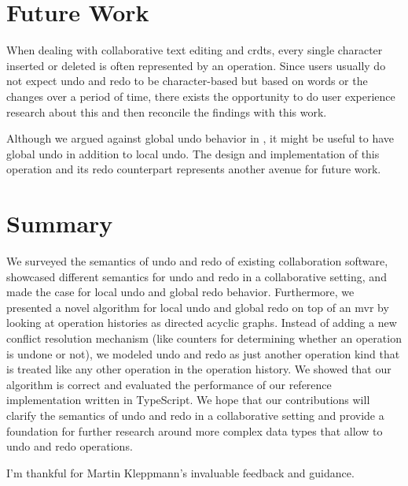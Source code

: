 \documentclass[sigplan,natbib=false,review]{acmart}
\begin{document}
\section{Future Work}\label{sec:future-work}

When dealing with collaborative text editing and \glspl*{crdt},
every single character inserted or deleted is often represented by an operation.
Since users usually do not expect undo and redo to be character-based but
based on words or the changes over a period of time, there exists the opportunity
to do user experience research about this and then reconcile the findings
with this work.

Although we argued against global undo behavior in ,
it might be useful to have global undo in addition to local undo.
The design and implementation of this operation and its redo counterpart
represents another avenue for future work.

\section{Summary}\label{sec:summary}

We surveyed the semantics of undo and redo of existing collaboration software,
showcased different semantics for undo and redo in a collaborative setting,
and made the case for local undo and global redo behavior.
Furthermore, we presented a novel algorithm for local undo and global redo
on top of an \gls*{mvr} by looking at operation histories
as directed acyclic graphs.
Instead of adding a new conflict resolution mechanism (like counters for
determining whether an operation is undone or not), we modeled undo and redo
as just another operation kind that is treated like any other operation in the
operation history.
We showed that our algorithm is correct and evaluated the performance
of our reference implementation written in TypeScript.
We hope that our contributions will clarify the semantics of undo and redo
in a collaborative setting and provide a foundation for further research around
more complex data types that allow to undo and redo operations.

\begin{acks}
I'm thankful for Martin Kleppmann's invaluable feedback and guidance.
\end{acks}

\printbibliography

\appendix
\end{document}
